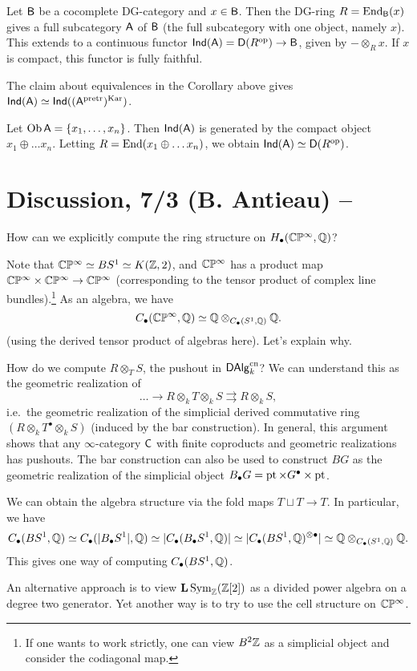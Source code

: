 \documentclass{amsart}
\begin{document}
\begin{ex}
	Let $\mathsf{B}$ be a cocomplete DG-category and $x \in \mathsf{B}$.
	Then the DG-ring $R = \operatorname{End}_{\mathsf{B}}(x)$ gives a full subcategory $\mathsf{A}$ of $\mathsf{B}$ (the full subcategory with one object, namely $x$).
	This extends to a continuous functor $\mathsf{Ind}(\mathsf{A}) = \mathsf{D}(R^{\mathrm{op}}) \to \mathsf{B}$, given by $- \otimes_R x$.
	If $x$ is compact, this functor is fully faithful.
\end{ex}

\begin{ex}
	The claim about equivalences in the Corollary above gives $\mathsf{Ind}(\mathsf{A}) \simeq \mathsf{Ind}((\mathsf{A}^{\mathrm{pretr}})^{\mathrm{Kar}})$.
\end{ex}

\begin{ex}
	Let $\operatorname{Ob} \mathsf{A} = \{ x_1, \dots, x_n \}$.
	Then $\mathsf{Ind}(\mathsf{A})$ is generated by the compact object $x_1 \oplus \dots x_n$.
	Letting $R = \operatorname{End}(x_1 \oplus \dots x_n)$, we obtain $\mathsf{Ind}(\mathsf{A}) \simeq \mathsf{D}(R^{\mathrm{op}})$.
\end{ex}

\section{Discussion, 7/3 (B. Antieau) -- }

How can we explicitly compute the ring structure on $H_\bullet(\mathbb{C}\mathbb{P}^\infty, \mathbb{Q})$?

Note that $\mathbb{C}\mathbb{P}^\infty \simeq BS^1 \simeq K(\mathbb{Z}, 2)$, and $\mathbb{C}\mathbb{P}^\infty$ has a product map $\mathbb{C}\mathbb{P}^\infty \times \mathbb{C}\mathbb{P}^\infty \to \mathbb{C}\mathbb{P}^\infty$ (corresponding to the tensor product of complex line bundles).\footnote{If one wants to work strictly, one can view $B^2 \mathbb{Z}$ as a simplicial object and consider the codiagonal map.}
As an algebra, we have 
\[
	C_\bullet(\mathbb{C}\mathbb{P}^\infty, \mathbb{Q}) \simeq \mathbb{Q} \otimes_{C_\bullet(S^1, \mathbb{Q})} \mathbb{Q}.
\]
(using the derived tensor product of algebras here).
Let's explain why.

How do we compute $R \otimes_T S$, the pushout in $\mathsf{DAlg}_k^{\mathrm{cn}}$?
We can understand this as the geometric realization of
\[
	\dots \to R \otimes_k T \otimes_k S \rightrightarrows R \otimes_k S,
\]
i.e.\ the geometric realization of the simplicial derived commutative ring $(R \otimes_k T^\bullet \otimes_k S)$ (induced by the bar construction).
In general, this argument shows that any $\infty$-category $\mathsf{C}$ with finite coproducts and geometric realizations has pushouts.
The bar construction can also be used to construct $BG$ as the geometric realization of the simplicial object $B_\bullet G = \operatorname{pt} \times G^\bullet \times \operatorname{pt}$.

We can obtain the algebra structure via the fold maps $T \sqcup T \to T$.
In particular, we have
\[
	C_\bullet(BS^1, \mathbb{Q}) \simeq C_\bullet(|B_\bullet S^1|, \mathbb{Q}) \simeq |C_\bullet(B_\bullet S^1, \mathbb{Q})| \simeq |C_\bullet(BS^1, \mathbb{Q})^{\otimes \bullet}| \simeq \mathbb{Q} \otimes_{C_\bullet(S^1, \mathbb{Q})} \mathbb{Q}.
\]
This gives one way of computing $C_\bullet(BS^1, \mathbb{Q})$.

An alternative approach is to view $\mathbf{L} \operatorname{Sym}_{\mathbb{Z}}(\mathbb{Z}[2])$ as a divided power algebra on a degree two generator.
Yet another way is to try to use the cell structure on $\mathbb{C}\mathbb{P}^\infty$.
\end{document}
